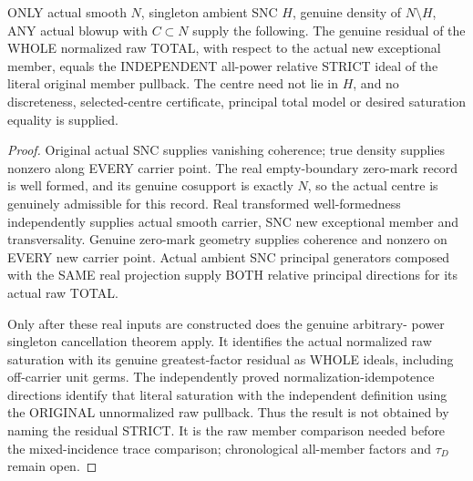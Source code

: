 \begin{theorem}
\label{hir:sharp-actual-any-member-raw-residual-independent-allpower-strict}
\leanok
ONLY actual smooth $N$, singleton ambient SNC $H$, genuine density of
$N\setminus H$, ANY actual blowup with $C\subset N$ supply the following.
The genuine residual of the WHOLE normalized raw TOTAL, with respect to
the actual new exceptional member, equals the INDEPENDENT all-power
relative STRICT ideal of the literal original member pullback. The centre
need not lie in $H$, and no discreteness, selected-centre certificate,
principal total model or desired saturation equality is supplied.
\end{theorem}
\begin{proof}
Original actual SNC supplies vanishing coherence; true density supplies
nonzero along EVERY carrier point. The real empty-boundary zero-mark
record is well formed, and its genuine cosupport is exactly $N$, so the
actual centre is genuinely admissible for this record. Real transformed
well-formedness independently supplies actual smooth carrier, SNC new
exceptional member and transversality. Genuine zero-mark geometry supplies
coherence and nonzero on EVERY new carrier point. Actual ambient SNC
principal generators composed with the SAME real projection supply BOTH
relative principal directions for its actual raw TOTAL.

Only after these real inputs are constructed does the genuine arbitrary-
power singleton cancellation theorem apply. It identifies the actual
normalized raw saturation with its genuine greatest-factor residual as
WHOLE ideals, including off-carrier unit germs. The independently proved
normalization-idempotence directions identify that literal saturation
with the independent definition using the ORIGINAL unnormalized raw
pullback. Thus the result is not obtained by naming the residual STRICT.
It is the raw member comparison needed before the mixed-incidence trace
comparison; chronological all-member factors and $\tau_D$ remain open.
\end{proof}

